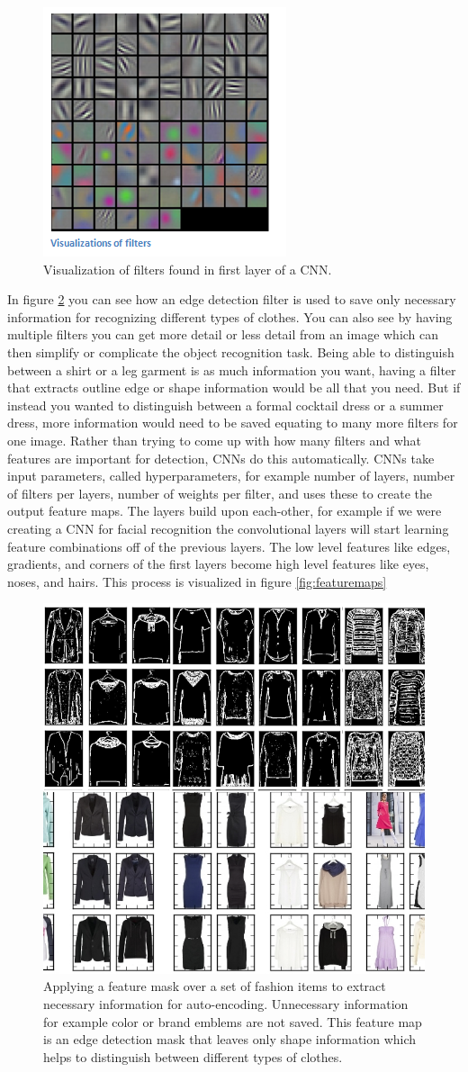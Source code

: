 \begin{figure}[htp!]
\centering
\includegraphics[width=.25\textwidth]{figs/conv1vis.png}
\caption{Visualization of filters found in first layer of a CNN.}
\label{fig:conv1vis}
\end{figure} 

In figure \ref{fig:convolution} you can see how an edge detection filter is used to save only necessary information for recognizing different types of clothes. You can also see by having multiple filters you can get more detail or less detail from an image which can then simplify or complicate the object recognition task. Being able to distinguish between a shirt or a leg garment is as much information you want, having a filter that extracts outline edge or shape information would be all that you need. But if instead you wanted to distinguish between a formal cocktail dress or a summer dress, more information would need to be saved equating to many more filters for one image. Rather than trying to come up with how many filters and what features are important for detection, CNNs do this automatically. CNNs take input parameters, called hyperparameters, for example number of layers, number of filters per layers, number of weights per filter, and uses these to create the output feature maps. The layers build upon each-other, for example if we were creating a CNN for facial recognition the convolutional layers will start learning feature combinations off of the previous layers. The low level features like edges, gradients, and corners of the first layers become high level features like eyes, noses, and hairs. This process is visualized in figure \ref{fig:featuremaps} 

\begin{figure}[t!]
\centering
\includegraphics[width=.48\linewidth]{figs/convolution.png}
\caption{Applying a feature mask over a set of fashion items to extract necessary information for auto-encoding. Unnecessary information for example color or brand emblems are not saved. This feature map is an edge detection mask that leaves only shape information which helps to distinguish between different types of clothes.} 
\label{fig:convolution}
\end{figure}

